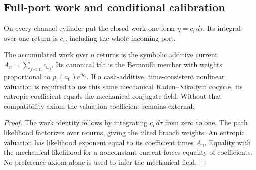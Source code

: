 \subsection{Full-port work and conditional calibration}

On every channel cylinder put the closed work one-form
\(\eta=c_i\,d\tau\).  Its integral over one return is \(c_i\), including the
whole incoming port.

\begin{theorem}
\label{thm:r10-a1-work}
The accumulated work over \(n\) returns is the symbolic additive current
\(A_n=\sum_{j<n}c_{\omega_j}\).  Its canonical tilt is the Bernoulli member
with weights proportional to \(p_i(a_0)e^{\vartheta c_i}\).  If a
cash-additive, time-consistent nonlinear valuation is required to use this
same mechanical Radon--Nikodym cocycle, its entropic coefficient equals the
mechanical conjugate field.  Without that compatibility axiom the valuation
coefficient remains external.
\end{theorem}

\begin{proof}
The work identity follows by integrating \(c_i\,d\tau\) from zero to one.
The path likelihood factorizes over returns, giving the tilted branch weights.
An entropic valuation has likelihood exponent equal to its coefficient times
\(A_n\).  Equality with the mechanical likelihood for a nonconstant current
forces equality of coefficients.  No preference axiom alone is used to infer
the mechanical field.
\end{proof}
